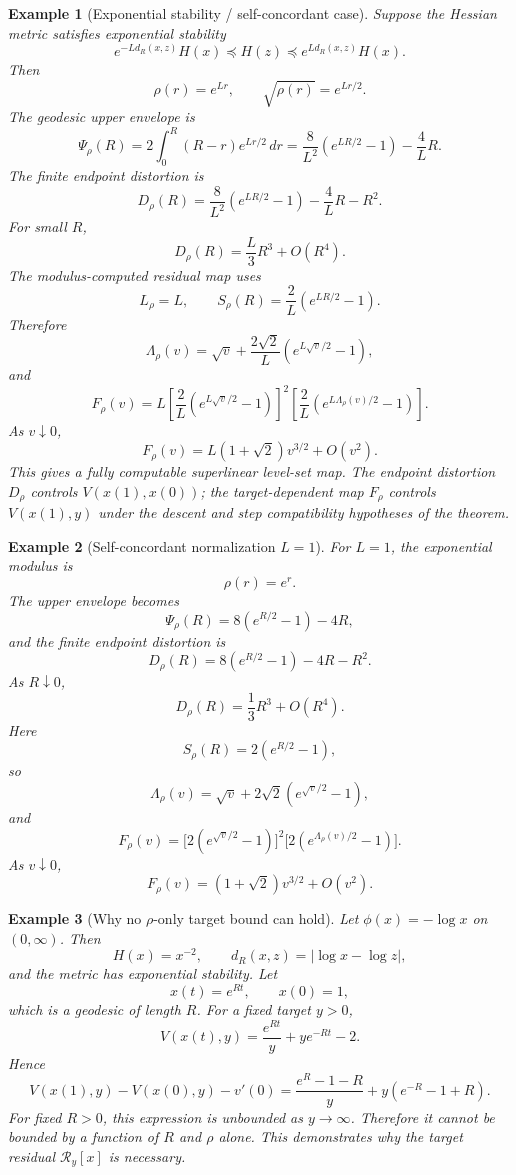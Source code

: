 \documentclass[11pt]{article}
\newtheorem{example}{Example}
\begin{document}
\begin{example}[Exponential stability / self-concordant case]
Suppose the Hessian metric satisfies exponential stability
\[
    e^{-L d_R(x,z)}H(x)
    \preceq
    H(z)
    \preceq
    e^{L d_R(x,z)}H(x).
\]
Then
\[
    \rho(r)=e^{Lr},
    \qquad
    \sqrt{\rho(r)}=e^{Lr/2}.
\]
The geodesic upper envelope is
\[
    \Psi_\rho(R)
    =
    2\int_0^R (R-r)e^{Lr/2}\,dr
    =
    \frac{8}{L^2}\left(e^{LR/2}-1\right)-\frac{4}{L}R.
\]
The finite endpoint distortion is
\[
    D_\rho(R)
    =
    \frac{8}{L^2}\left(e^{LR/2}-1\right)-\frac{4}{L}R-R^2.
\]
For small $R$,
\[
    D_\rho(R)=\frac{L}{3}R^3+O(R^4).
\]
The modulus-computed residual map uses
\[
    L_\rho=L,
    \qquad
    S_\rho(R)=\frac{2}{L}\left(e^{LR/2}-1\right).
\]
Therefore
\[
    \Lambda_\rho(v)
    =
    \sqrt v+\frac{2\sqrt2}{L}\left(e^{L\sqrt v/2}-1\right),
\]
and
\[
    F_\rho(v)
    =
    L\left[\frac{2}{L}\left(e^{L\sqrt v/2}-1\right)\right]^2
    \left[\frac{2}{L}\left(e^{L\Lambda_\rho(v)/2}-1\right)\right].
\]
As $v\downarrow0$,
\[
    F_\rho(v)=L(1+\sqrt2)v^{3/2}+O(v^2).
\]
This gives a fully computable superlinear level-set map.  The endpoint distortion
$D_\rho$ controls $V(x(1),x(0))$; the target-dependent map $F_\rho$ controls
$V(x(1),y)$ under the descent and step compatibility hypotheses of the theorem.
\end{example}

\begin{example}[Self-concordant normalization $L=1$]
For $L=1$, the exponential modulus is
\[
    \rho(r)=e^r.
\]
The upper envelope becomes
\[
    \Psi_\rho(R)
    =
    8\left(e^{R/2}-1\right)-4R,
\]
and the finite endpoint distortion is
\[
    D_\rho(R)
    =
    8\left(e^{R/2}-1\right)-4R-R^2.
\]
As $R\downarrow0$,
\[
    D_\rho(R)=\frac13 R^3+O(R^4).
\]
Here
\[
    S_\rho(R)=2(e^{R/2}-1),
\]
so
\[
    \Lambda_\rho(v)
    =
    \sqrt v+2\sqrt2(e^{\sqrt v/2}-1),
\]
and
\[
    F_\rho(v)
    =
    \bigl[2(e^{\sqrt v/2}-1)\bigr]^2
    \bigl[2(e^{\Lambda_\rho(v)/2}-1)\bigr].
\]
As $v\downarrow0$,
\[
    F_\rho(v)=(1+\sqrt2)v^{3/2}+O(v^2).
\]
\end{example}

\begin{example}[Why no $\rho$-only target bound can hold]
Let $\phi(x)=-\log x$ on $(0,\infty)$. Then
\[
    H(x)=x^{-2},
    \qquad
    d_R(x,z)=|\log x-\log z|,
\]
and the metric has exponential stability. Let
\[
    x(t)=e^{Rt},
    \qquad
    x(0)=1,
\]
which is a geodesic of length $R$. For a fixed target $y>0$,
\[
    V(x(t),y)
    =
    \frac{e^{Rt}}{y}+y e^{-Rt}-2.
\]
Hence
\[
    V(x(1),y)-V(x(0),y)-v'(0)
    =
    \frac{e^R-1-R}{y}+y(e^{-R}-1+R).
\]
For fixed $R>0$, this expression is unbounded as $y\to\infty$. Therefore it cannot be bounded by a function of $R$ and $\rho$ alone. This demonstrates why the target residual $\mathcal R_y[x]$ is necessary.
\end{example}
\end{document}
